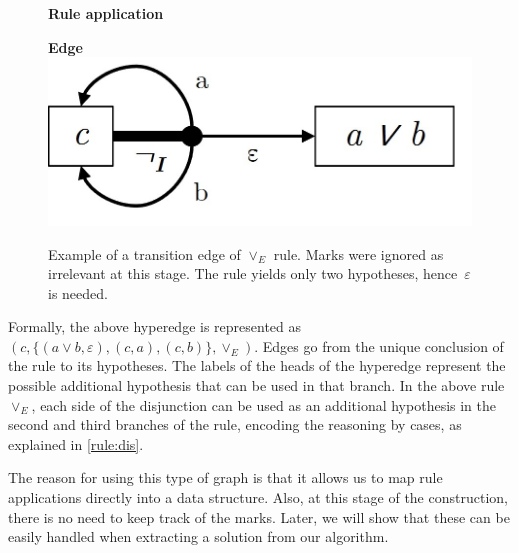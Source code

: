 \begin{figure}[h]
\centering
\begin{minipage}{0.45\textwidth}
    \centering
    \textbf{Rule application} \\[0.5em]
    \begin{prooftree}
    \end{prooftree}
\end{minipage}
\hfill
\begin{minipage}{0.45\textwidth}
    \centering
    \textbf{Edge} \\[0.5em]
    \includegraphics[width=\linewidth]{Chapters/Figures/te-pl-example.jpg}
\end{minipage}
 \caption{Example of a transition edge of \(\vee_E\) rule. Marks were ignored as irrelevant at this stage. The rule yields only two hypotheses, hence~$\varepsilon$ is needed.}
\label{fig:te-pl-ex}
\end{figure}

Formally, the above hyperedge is represented as $(c, \{(a \lor b, \varepsilon), (c, a), (c, b)\}, \vee_E)$. Edges go from the unique conclusion of the rule to its hypotheses. The labels of the heads of the hyperedge represent the possible additional hypothesis that can be used in that branch. In the above rule $\vee_E$, each side of the disjunction can be used as an additional hypothesis in the second and third branches of the rule, encoding the reasoning by cases, as explained in \autoref{rule:dis}.

The reason for using this type of graph is that it allows us to map rule applications directly into a data structure. Also, at this stage of the construction, there is no need to keep track of the marks. Later, we will show that these can be easily handled when extracting a solution from our algorithm.

